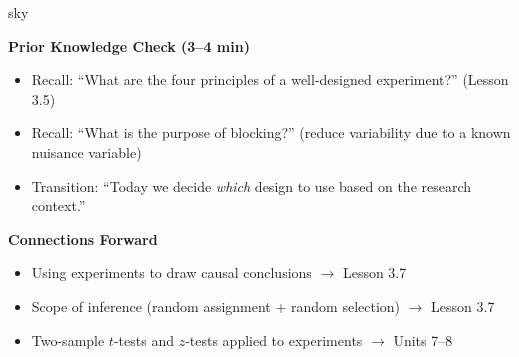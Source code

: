 \documentclass[10pt]{article}
\begin{document}
\begin{skillbox}{sky}
\begin{minipage}[t]{0.48\linewidth}
    \textbf{Prior Knowledge Check (3--4 min)}
    \begin{itemize}
        \item Recall: ``What are the four principles of a well-designed experiment?''
              (Lesson 3.5)
        \item Recall: ``What is the purpose of blocking?'' (reduce variability due to a
              known nuisance variable)
        \item Transition: ``Today we decide \emph{which} design to use based on the
              research context.''
    \end{itemize}
\end{minipage}
\hfill
\begin{minipage}[t]{0.48\linewidth}
    \textbf{Connections Forward}
    \begin{itemize}
        \item Using experiments to draw causal conclusions $\to$ Lesson 3.7
        \item Scope of inference (random assignment + random selection) $\to$ Lesson 3.7
        \item Two-sample $t$-tests and $z$-tests applied to experiments $\to$ Units 7--8
    \end{itemize}
\end{minipage}
\end{skillbox}
\end{document}
